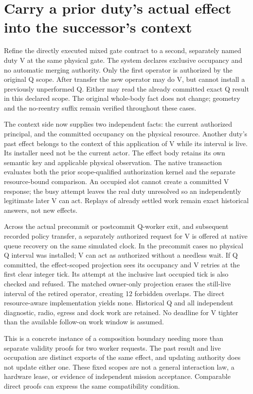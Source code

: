\documentclass{article}
\begin{document}
\section*{Carry a prior duty's actual effect into the successor's context}
Refine the directly executed mixed gate contract to a second,
separately named duty V at the same physical gate. The system
declares exclusive occupancy and no automatic merging authority.
Only the first operator is authorized by the original Q scope.
After transfer the new operator may do V, but cannot install a
previously unperformed Q. Either may read the already committed
exact Q result in this declared scope. The original whole-body
fact does not change; geometry and the no-reentry suffix remain
verified throughout these cases.

The context side now supplies two independent facts: the current
authorized principal, and the committed occupancy on the physical
resource. Another duty's past effect belongs to the context of
this application of V while its interval is live. Its installer
need not be the current actor. The effect body retains its own
semantic key and applicable physical observation. The native
transaction evaluates both the prior scope-qualified authorization
kernel and the separate resource-bound comparison. An occupied
slot cannot create a committed V response; the busy attempt
leaves the real duty unresolved so an independently legitimate
later V can act. Replays of already settled work remain exact
historical answers, not new effects.

Across the actual precommit or postcommit Q-worker exit,
and subsequent recorded policy transfer, a separately authorized
request for V is offered at native queue recovery on the same
simulated clock. In
the precommit cases no physical Q interval was installed; V
can act as authorized without a needless wait. If Q committed,
the effect-scoped projection sees its occupancy and V retries
at the first clear integer tick. Its attempt at the inclusive last
occupied tick is also checked and refused. The matched
owner-only projection erases the still-live interval of the
retired operator, creating 12 forbidden overlaps. The direct
resource-aware implementation yields none. Historical Q and
all independent diagnostic, radio, egress and dock work are
retained. No deadline for V tighter than the available
follow-on work window is assumed.

This is a concrete instance of a composition boundary needing
more than separate validity proofs for two worker requests.
The past result and live occupation are distinct exports of
the same effect, and updating authority does not update either
one. These fixed scopes are not a general interaction law,
a hardware lease, or evidence of independent mission
acceptance. Comparable direct proofs can express the same
compatibility condition.
\end{document}
